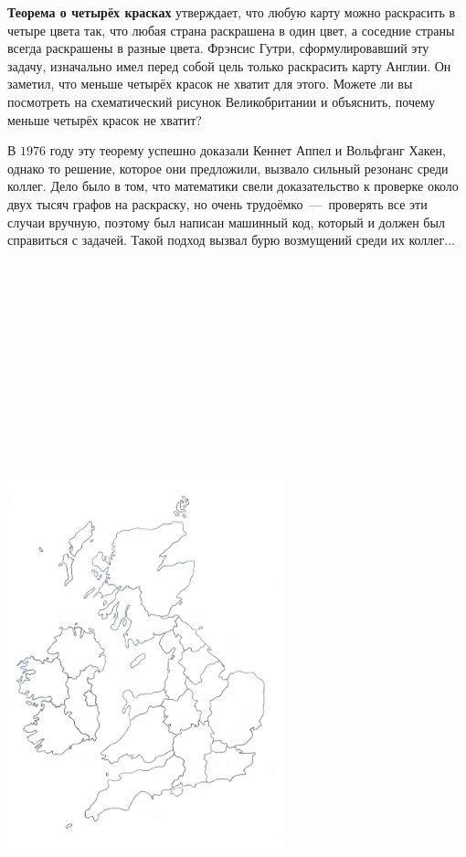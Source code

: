 \begin{paracol}{2}
	\textbf{Теорема о четырёх красках} утверждает, что любую карту можно раскрасить в четыре цвета так, что любая страна раскрашена в один цвет, а соседние страны всегда раскрашены в разные цвета. Фрэнсис Гутри, сформулировавший эту задачу, изначально имел перед собой цель только раскрасить карту Англии. Он заметил, что меньше четырёх красок не хватит для этого. Можете ли вы посмотреть на схематический рисунок Великобритании и объяснить, почему меньше четырёх красок не хватит?
	
	В $1976$ году эту теорему успешно доказали Кеннет Аппел и Вольфганг Хакен, однако то решение, которое они предложили, вызвало сильный резонанс среди коллег. Дело было в том, что математики свели доказательство к проверке около двух тысяч графов на раскраску, но очень трудоёмко~---~проверять все эти случаи вручную, поэтому был написан машинный код, который и должен был справиться с задачей. Такой подход вызвал бурю возмущений среди их коллег...
\switchcolumn
\includegraphics[width=8cm, height=24cm,keepaspectratio]{sections/images/England}

\end{paracol}
